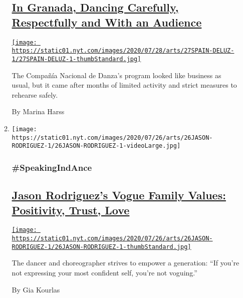 \begin{enumerate}
\begin{enumerate}
    \hypertarget{in-granada-dancing-carefully-respectfully-and-with-an-audience}{%
    \subsection{\texorpdfstring{\href{/2020/07/27/arts/dance/granada-festival-compania-nacional-de-danza.html}{In
    Granada, Dancing Carefully, Respectfully and With an
    Audience}}{In Granada, Dancing Carefully, Respectfully and With an Audience}}\label{in-granada-dancing-carefully-respectfully-and-with-an-audience}}

    \href{/2020/07/27/arts/dance/granada-festival-compania-nacional-de-danza.html}{\texttt{[image: https://static01.nyt.com/images/2020/07/28/arts/27SPAIN-DELUZ-1/27SPAIN-DELUZ-1-thumbStandard.jpg]}}

    The Compañía Nacional de Danza's program looked like business as
    usual, but it came after months of limited activity and strict
    measures to rehearse safely.

    By Marina Harss
  \item
    \texttt{[image: https://static01.nyt.com/images/2020/07/26/arts/26JASON-RODRIGUEZ-1/26JASON-RODRIGUEZ-1-videoLarge.jpg]}

    \hypertarget{speakingindance}{%
    \subsubsection{\#SpeakingIndAnce}\label{speakingindance}}

    \hypertarget{jason-rodriguezs-vogue-family-values-positivity-trust-love}{%
    \subsection{\texorpdfstring{\href{/2020/07/24/arts/dance/jason-rodriguez-vogue-pose.html}{Jason
    Rodriguez's Vogue Family Values: Positivity, Trust,
    Love}}{Jason Rodriguez's Vogue Family Values: Positivity, Trust, Love}}\label{jason-rodriguezs-vogue-family-values-positivity-trust-love}}

    \href{/2020/07/24/arts/dance/jason-rodriguez-vogue-pose.html}{\texttt{[image: https://static01.nyt.com/images/2020/07/26/arts/26JASON-RODRIGUEZ-1/26JASON-RODRIGUEZ-1-thumbStandard.jpg]}}

    The dancer and choreographer strives to empower a generation: ``If
    you're not expressing your most confident self, you're not
    voguing.''

    By Gia Kourlas
  \end{enumerate}
\end{enumerate}

